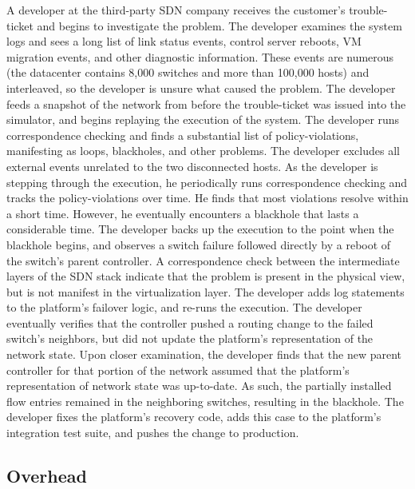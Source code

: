  A developer at the third-party SDN
company receives the customer's trouble-ticket and begins to investigate the
problem. The developer examines the system logs and sees a
long list of link status events, control server reboots, VM migration events,
and other diagnostic information. These events are numerous (the
datacenter contains 8,000 switches and more than 100,000 hosts) and
interleaved, so the developer is unsure what caused the problem.
The developer feeds a snapshot of the network from before the
trouble-ticket was issued into the simulator, and
begins replaying the execution of the system. The developer runs
correspondence checking and finds a substantial list of policy-violations,
manifesting as loops, blackholes, and other problems.
The developer excludes all external events
unrelated to the two disconnected hosts. As the developer is stepping through the execution, he periodically
runs correspondence checking and tracks the policy-violations over time. He
finds that most violations resolve within a short time. However, he
eventually encounters a blackhole that lasts a considerable time. The
developer backs up the execution to the point when the blackhole begins, and
observes a switch failure followed directly by a reboot of the switch's parent
controller. A correspondence check between the intermediate layers of the SDN
stack indicate that the problem is present in the
physical view, but is not manifest in the virtualization layer. The developer adds log statements to the platform's failover
logic, and re-runs the execution. The developer eventually verifies that the
controller pushed a routing change to the failed switch's neighbors, but did
not update the platform's representation of the network state. Upon closer
examination, the developer finds that the new parent controller for that
portion of the network assumed that the platform's
representation of network state was up-to-date. As such, the partially installed flow entries remained
in the neighboring switches, resulting in the blackhole. The developer fixes
the platform's recovery code, adds this case to the platform's integration
test suite, and pushes the change to production. 

\subsection{Overhead}

